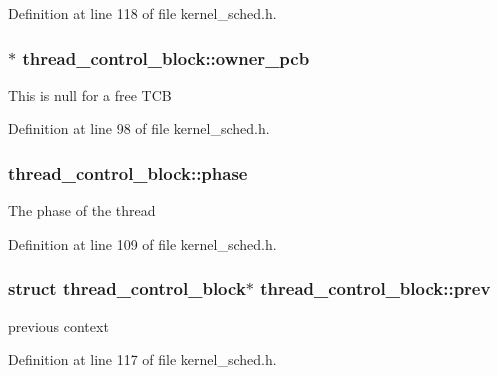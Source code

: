 Definition at line 118 of file kernel\+\_\+sched.\+h.

\subsubsection[{\texorpdfstring{owner\+\_\+pcb}{owner_pcb}}]{$\ast$ thread\+\_\+control\+\_\+block\+::owner\+\_\+pcb}\hypertarget{structthread__control__block_a74aa312623cb8be2bc719d5210b58c04}{}\label{structthread__control__block_a74aa312623cb8be2bc719d5210b58c04}
This is null for a free T\+CB 

Definition at line 98 of file kernel\+\_\+sched.\+h.

\subsubsection[{\texorpdfstring{phase}{phase}}]{ thread\+\_\+control\+\_\+block\+::phase}\hypertarget{structthread__control__block_aa7e8e6a00c5f9f25210a49589ad818f8}{}\label{structthread__control__block_aa7e8e6a00c5f9f25210a49589ad818f8}
The phase of the thread 

Definition at line 109 of file kernel\+\_\+sched.\+h.

\subsubsection[{\texorpdfstring{prev}{prev}}]{\setlength{\rightskip}{0pt plus 5cm}struct {\bf thread\+\_\+control\+\_\+block}$\ast$ thread\+\_\+control\+\_\+block\+::prev}\hypertarget{structthread__control__block_a605a6e9bb8154b658ee72e193599d180}{}\label{structthread__control__block_a605a6e9bb8154b658ee72e193599d180}
previous context 

Definition at line 117 of file kernel\+\_\+sched.\+h.


